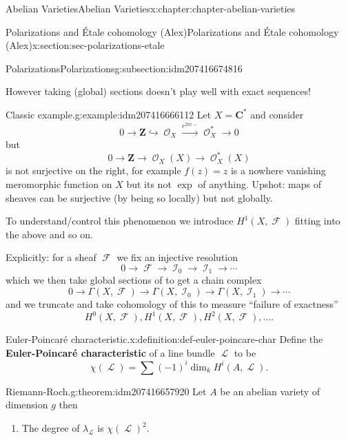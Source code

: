 \documentclass[oneside,10pt,]{book}
\newcommand{\terminology}[1]{\textbf{#1}}
\numberwithin{equation}{section}
\newcommand{\sheaf}[1]{\operatorname{\mathcal{#1}}}
\newcommand{\ZZ}{\mathbf{Z}}
\newcommand{\CC}{\mathbf{C}}
\begin{document}
\begin{chapterptx}{Abelian Varieties}{}{Abelian Varieties}{}{}{x:chapter:chapter-abelian-varieties}
\begin{sectionptx}{Polarizations and Étale cohomology (Alex)}{}{Polarizations and Étale cohomology (Alex)}{}{}{x:section:sec-polarizations-etale}
\begin{subsectionptx}{Polarizations}{}{Polarizations}{}{}{g:subsection:idm207416674816}
\par
However taking (global) sections doesn't play well with exact sequences!%
\begin{example}{Classic example.}{g:example:idm207416666112}%
Let \(X = \CC^*\) and consider%
\begin{equation*}
0 \to \ZZ \hookrightarrow \sheaf O_X \xrightarrow{e^{2\pi i -}} \sheaf O_X^* \to 0
\end{equation*}
but%
\begin{equation*}
0 \to \ZZ \to \sheaf O_X(X) \to \sheaf O_X^*(X)
\end{equation*}
is not surjective on the right, for example \(f(z) = z\) is a nowhere vanishing meromorphic function on \(X\) but its not \(\exp\) of anything. Upshot: maps of sheaves can be surjective (by being so locally) but not globally.%
\end{example}
To understand\slash{}control this phenomenon we introduce \(H^1(X, \sheaf F)\) fitting into the above and so on.%
\par
Explicitly: for a sheaf \(\sheaf F\) we fix an injective resolution%
\begin{equation*}
0\to \sheaf F \to \sheaf I_0 \to \sheaf I_1 \to \cdots
\end{equation*}
which we then take global sections of to get a chain complex%
\begin{equation*}
0\to \Gamma(X,\sheaf F) \to \Gamma(X,\sheaf I_0) \to \Gamma(X,\sheaf I_1) \to \cdots
\end{equation*}
and we truncate and take cohomology of this to measure ``failure of exactness''%
\begin{equation*}
H^0(X, \sheaf F) , H^1(X, \sheaf F) , H^2(X, \sheaf F) , \ldots\text{.}
\end{equation*}
%
\begin{definition}{Euler-Poincaré characteristic.}{x:definition:def-euler-poincare-char}%
Define the \terminology{Euler-Poincaré characteristic} of a line bundle \(\sheaf L\) to be%
\begin{equation*}
\chi(\sheaf L) = \sum (-1)^i \dim_k H^i(A,\sheaf L)\text{.}
\end{equation*}
%
\end{definition}
\begin{theorem}{Riemann-Roch.}{}{g:theorem:idm207416657920}%
Let \(A\) be an abelian variety of dimension \(g\) then%
\begin{enumerate}
\item{}The degree of \(\lambda_{\sheaf L}\) is \(\chi(\sheaf L)^2\).%

\end{enumerate}
\end{theorem}
\end{subsectionptx}
\end{sectionptx}
\end{chapterptx}
\end{document}
